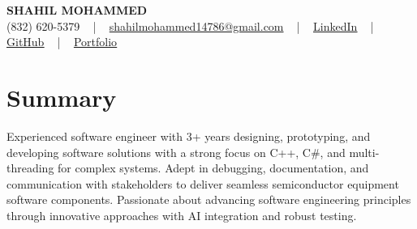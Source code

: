 \documentclass[letterpaper,10pt]{article}
\begin{document}
\begin{center}
    {\fontsize{14pt}{12pt}\selectfont \textbf{\MakeUppercase{Shahil Mohammed}}}\\ \vspace{2pt}
    \fontsize{10pt}{12pt}\selectfont (832) 620-5379 ~ | ~ \href{mailto:shahilmohammed14786@gmail.com}{shahilmohammed14786@gmail.com} ~ | ~  
    \href{https://www.linkedin.com/in/shahil-mohammed-9652931a1/}{\color{blue}\underline{LinkedIn}}  ~ | ~ 
    \href{https://github.com/freakbeast14}{\color{blue}\underline{GitHub}} ~ | ~ 
    \href{https://shahil-mohammed.netlify.app/}{\color{blue}\underline{Portfolio}}
    \vspace{-8pt}
\end{center}

\section{Summary}
\vspace{-2pt}\fontsize{8pt}{9pt}\selectfont
Experienced software engineer with 3+ years designing, prototyping, and developing software solutions with a strong focus on C++, C\#, and multi-threading for complex systems. Adept in debugging, documentation, and communication with stakeholders to deliver seamless semiconductor equipment software components. Passionate about advancing software engineering principles through innovative approaches with AI integration and robust testing.
 \vspace{-5pt}
 
\vspace{-2pt}
\end{document}
